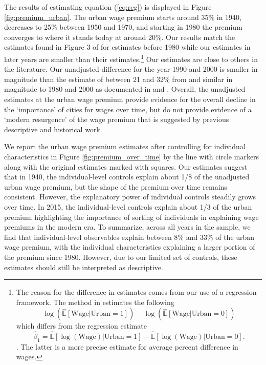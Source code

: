 \documentclass[12pt,twoside]{article}
\begin{document}
The results of estimating equation (\ref{eq:reg}) is displayed in Figure \ref{fig:premium_urban}. 
The urban wage premium starts around 35\% in 1940, decreases to 25\% between 1950 and 1970, and starting in 1980 the premium converges to where it stands today at around 20\%. 
Our results match the estimates found in Figure 3 of \citet{Boustan_Bunten_Hearey_2013} for estimates before 1980 while our estimates in later years are smaller than their estimates.\footnote{The reason for the difference in estimates comes from our use of a regression framework. The method in \citet{Boustan_Bunten_Hearey_2013} estimates the following
\[ 
    \log( \hat{\mathbb{E}}[\text{Wage} | \text{Urban} = 1] ) - \log( \hat{\mathbb{E}}[\text{Wage} | \text{Urban} = 0] )
\]
which differs from the regression estimate
\[ 
    \hat{\beta}_1 = \hat{\mathbb{E}}[ \log(\text{Wage}) | \text{Urban} = 1] - \hat{\mathbb{E}}[ \log(\text{Wage}) | \text{Urban} = 0].
\]. The latter is a more precise estimate for average percent difference in wages.} 
Our estimates are close to others in the literature. 
Our unadjusted difference for the year 1990 and 2000 is smaller in magnitude than the estimate of between 21 and 32\% from \citet{Glaeser_Mare_2001} and similar in magnitude to 1980 and 2000 as documented in \citet{Baum-Snow_Pavan_2012} and \citet{Boustan_Bunten_Hearey_2013}. 
Overall, the unadjusted estimates at the urban wage premium provide evidence for the overall decline in the `importance' of cities for wages over time, but do not provide evidence of a `modern resurgence' of the wage premium that is suggested by previous descriptive and historical work.

We report the urban wage premium estimates after controlling for individual characteristics in Figure \ref{fig:premium_over_time} by the line with circle markers along with the original estimates marked with squares. 
Our estimates suggest that in 1940, the individual-level controls explain about 1/8 of the unadjusted urban wage premium, but the shape of the premium over time remains consistent. 
However, the explanatory power of individual controls steadily grows over time. 
In 2015, the individual-level controls explain about 1/3 of the urban premium highlighting the importance of sorting of individuals in explaining wage premiums in the modern era. 
To summarize, across all years in the sample, we find that individual-level observables explain between 8\% and 33\% of the urban wage premium, with the individual characteristics explaining a larger portion of the premium since 1980.
However, due to our limited set of controls, these estimates should still be interpreted as descriptive.
\end{document}
